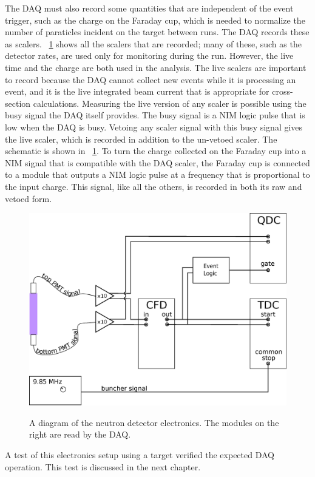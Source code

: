 The DAQ must also record some quantities that are independent of the event trigger, such as the charge on the Faraday cup, which is needed to normalize the number of paraticles incident on the target between runs.  The DAQ records these as scalers.  \fig~\ref{fig:fullElectronics} shows all the scalers that are recorded; many of these, such as the detector rates, are used only for monitoring during the run.  However, the live time and the charge are both used in the analysis.  The live scalers are important to record because the DAQ cannot collect new events while it is processing an event, and it is the live integrated beam current that is appropriate for cross-section calculations.  Measuring the live version of any scaler is possible using the busy signal the DAQ itself provides.  The busy signal is a NIM logic pulse that is low when the DAQ is busy.  Vetoing any scaler signal with this busy signal gives the live scaler, which is recorded in addition to the un-vetoed scaler.  The schematic is shown in \fig~\ref{fig:fullElectronics}.  To turn the charge collected on the Faraday cup into a NIM signal that is compatible with the DAQ scaler, the Faraday cup is connected to a module that outputs a NIM logic pulse at a frequency that is proportional to the input charge.  This signal, like all the others, is recorded in both its raw and vetoed form.
\begin{figure}[htp]
\centering
\includegraphics[width=1.0\textwidth]{figures/basic_electronics.eps}
\label{fig:fullElectronics}
\caption{A diagram of the neutron detector electronics.  The modules on the right are read by the DAQ.}
\end{figure}
A test of this electronics setup using a  target verified the expected DAQ operation.  This test is discussed in the next chapter. 

%
% 
% 
